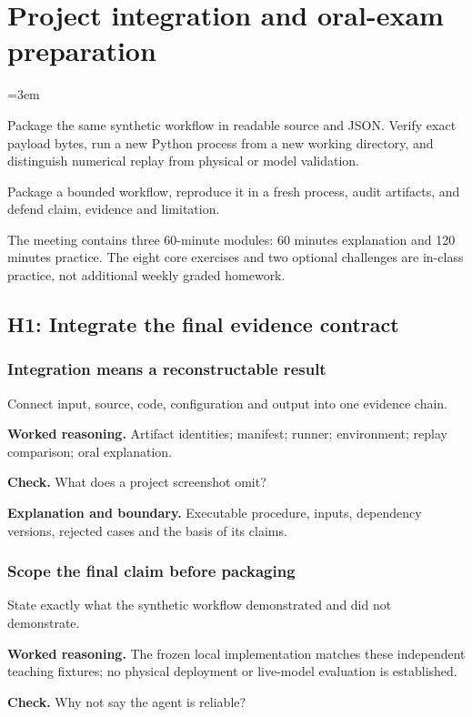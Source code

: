 \chapter{Project integration and oral-exam preparation}\label{chap:w17-studio}
\emergencystretch=3em

Package the same synthetic workflow in readable source and JSON. Verify exact payload bytes, run a new Python process from a new working directory, and distinguish numerical replay from physical or model validation.
\begin{learningbox}Package a bounded workflow, reproduce it in a fresh process, audit artifacts, and defend claim, evidence and limitation.\end{learningbox}
The meeting contains three 60-minute modules: 60 minutes explanation and 120 minutes practice. The eight core exercises and two optional challenges are in-class practice, not additional weekly graded homework.
\section{H1: Integrate the final evidence contract}
\subsection{Integration means a reconstructable result}
Connect input, source, code, configuration and output into one evidence chain.

\textbf{Worked reasoning.} Artifact identities; manifest; runner; environment; replay comparison; oral explanation.

\textbf{Check.} What does a project screenshot omit?

\textbf{Explanation and boundary.} Executable procedure, inputs, dependency versions, rejected cases and the basis of its claims.

\subsection{Scope the final claim before packaging}
State exactly what the synthetic workflow demonstrated and did not demonstrate.

\textbf{Worked reasoning.} The frozen local implementation matches these independent teaching fixtures; no physical deployment or live-model evaluation is established.

\textbf{Check.} Why not say the agent is reliable?


